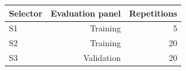 \begin{tabular}{lrr}
\toprule
Selector & Evaluation panel & Repetitions \\
\midrule
S1 & Training & 5 \\
S2 & Training & 20 \\
S3 & Validation & 20 \\
\bottomrule
\end{tabular}
